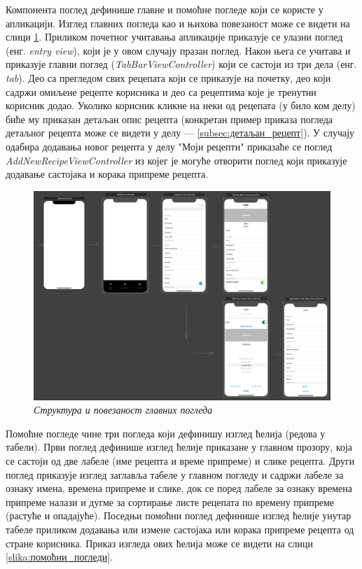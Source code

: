 \documentclass[12pt,oneside]{memoir}
\begin{document}
Компонента поглед дефинише главне и помоћне погледе који се користе у апликацији. Изглед главних погледа као и њихова повезаност може се видети на слици \ref{slika:главни_погледи}. Приликом почетног учитавања апликације приказује се улазни поглед (енг. \textit{entry view}), који је у овом случају празан поглед. Након њега се учитава и приказује главни поглед (\textit{TabBarViewController}) који се састоји из три дела (енг. \textit{tab}). Део са прегледом свих рецепата који се приказује на почетку, део који садржи омиљене рецепте корисника и део са рецептима које је тренутни корисник додао. Уколико корисник кликне на неки од рецепата (у било ком делу) биће му приказан детаљан опис рецепта (конкретан пример приказа погледа детаљног рецепта може се видети у делу  --- \ref{subsec:детаљан_рецепт}). У случају одабира додавања новог рецепта у делу "Моји рецепти" приказаће се поглед \textit{AddNewRecipeViewController} из којег је могуће отворити поглед који приказује додавање састојака и корака припреме рецепта.

\begin{figure} [H]
    \centering
    \captionsetup{justification=centering}
    \includegraphics[width=1\textwidth]{images/view_structure.png} 
    \caption{\textit{Структура и повезаност главних погледа}}
    \label{slika:главни_погледи}
\end{figure}

Помоћне погледе чине три погледа који дефинишу изглед ћелија (редова у табели). Први поглед дефинише изглед ћелије приказане у главном прозору, која се састоји од две лабеле (име рецепта и време припреме) и слике рецепта. Други поглед приказује изглед заглавља табеле у главном погледу и садржи лабеле за ознаку имена, времена припреме и слике, док се поред лабеле за ознаку времена припреме налази и дугме за сортирање листе рецепата по времену припреме (растуће и опадајуће). Поседњи помоћни поглед дефинише изглед ћелије унутар табеле приликом додавања или измене састојака или корака припреме рецепта од стране корисника. Приказ изгледа ових ћелија може се видети на слици \ref{slika:помоћни_погледи}.
\end{document}
